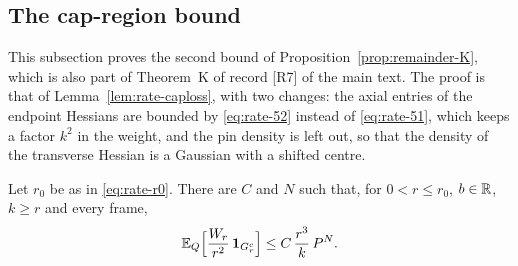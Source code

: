\subsection{The cap-region bound}\label{ssec:remainder-capK}

This subsection proves the second bound of Proposition~\ref{prop:remainder-K}, which is also part of Theorem~K of record [R7] of the main text. The proof is that of Lemma~\ref{lem:rate-caploss}, with two changes: the axial entries of the endpoint Hessians are bounded by \eqref{eq:rate-52} instead of \eqref{eq:rate-51}, which keeps a factor $k^2$ in the weight, and the pin density is left out, so that the density of the transverse Hessian is a Gaussian with a shifted centre.

\begin{lemma}\label{lem:remainder-capK}
Let $r_0$ be as in \eqref{eq:rate-r0}. There are $C$ and $N$ such that, for $0<r\le r_0$, $b\in\mathbb R$, $k\ge r$ and every frame,
\begin{equation}\label{eq:remainder-capK}
\mathbb E_Q\Bigl[\frac{W_r}{r^2}\,\mathbf 1_{G_r^c}\Bigr]\le C\,\frac{r^3}k\,P^N .
\end{equation}
\end{lemma}

